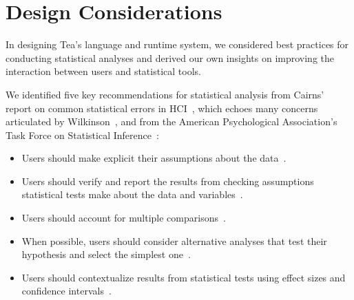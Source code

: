 \otherSystems

\section{Design Considerations} \label{sec:design} \label{sec:designConsiderationsTea}



In designing Tea's language and runtime system, we considered best practices for conducting statistical analyses and derived our own insights on improving the
interaction between users and statistical tools.

We identified five key recommendations for statistical analysis from Cairns' report on common
statistical errors in HCI~\cite{cairns2007hci}, which echoes many concerns articulated by Wilkinson~\cite{wilkinson1999statistical}, and from the American Psychological Association's
Task Force on Statistical Inference~\cite{APATFSI}: 
\begin{itemize}
    \item Users should make explicit their assumptions about the data~\cite{APATFSI}. 
    \item Users should verify and report the results from checking assumptions statistical tests make about the data
    and variables~\cite{cairns2007hci,APATFSI}.
    \item Users should account for multiple comparisons~\cite{cairns2007hci,APATFSI}.
    \item When possible, users should consider alternative analyses that test their hypothesis and select the simplest one~\cite{APATFSI}.
    \item Users should contextualize results from statistical tests using effect sizes and confidence intervals~\cite{APATFSI}.
\end{itemize}

